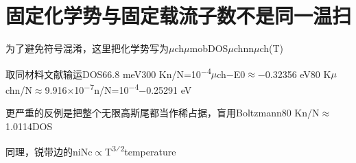 \documentclass[11pt,a4paper]{article}
\begin{document}
\section{{\cjkfont 固定化学势与固定载流子数不是同一温扫}\allowbreak{}}\label{sec:48}
{\cjkfont 为了避免符号混淆，这里把化学势写为}\allowbreak{}\ensuremath{\mu}ch\allowbreak{}\ensuremath{\mu}mob\allowbreak{}DOS\allowbreak{}\ensuremath{\mu}ch\allowbreak{}n\allowbreak{}n\allowbreak{}\ensuremath{\mu}ch(T)\allowbreak{}
\par
{\cjkfont 取同材料文献输运}\allowbreak{}DOS\allowbreak{}66.8 meV\allowbreak{}300 K\allowbreak{}n/N=\allowbreak{}10\textsuperscript{−4}\allowbreak{}\ensuremath{\mu}ch−E0\ensuremath{\approx}\allowbreak{}−0.32356 eV\allowbreak{}80 K\allowbreak{}\ensuremath{\mu}ch\allowbreak{}n/N\ensuremath{\approx}\allowbreak{}9.916\ensuremath{\times}10\textsuperscript{−7}\allowbreak{}n/N=\allowbreak{}10\textsuperscript{−4}\allowbreak{}−0.25291 eV\allowbreak{}
\par
{\cjkfont 更严重的反例是把整个无限高斯尾都当作稀占据，盲用}\allowbreak{}Boltzmann\allowbreak{}80 K\allowbreak{}n/N\ensuremath{\approx}\allowbreak{}1.0114\allowbreak{}DOS\allowbreak{}
\par
{\cjkfont 同理，锐带边的}\allowbreak{}ni\allowbreak{}Nc\ensuremath{\propto}T\textsuperscript{3⁄2}\allowbreak{}temperature\allowbreak{}
\end{document}
